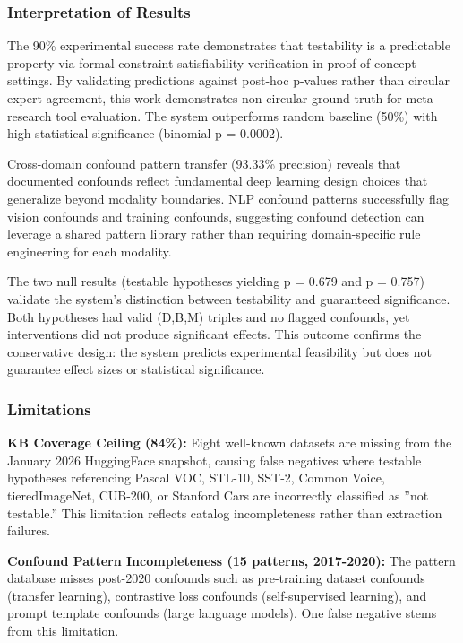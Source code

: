 
\subsubsection{Interpretation of Results}

The 90\% experimental success rate demonstrates that testability is a predictable property via formal constraint-satisfiability verification in proof-of-concept settings. By validating predictions against post-hoc p-values rather than circular expert agreement, this work demonstrates non-circular ground truth for meta-research tool evaluation. The system outperforms random baseline (50\%) with high statistical significance (binomial p = 0.0002).

Cross-domain confound pattern transfer (93.33\% precision) reveals that documented confounds reflect fundamental deep learning design choices that generalize beyond modality boundaries. NLP confound patterns successfully flag vision confounds and training confounds, suggesting confound detection can leverage a shared pattern library rather than requiring domain-specific rule engineering for each modality.

The two null results (testable hypotheses yielding p = 0.679 and p = 0.757) validate the system's distinction between testability and guaranteed significance. Both hypotheses had valid (D,B,M) triples and no flagged confounds, yet interventions did not produce significant effects. This outcome confirms the conservative design: the system predicts experimental feasibility but does not guarantee effect sizes or statistical significance.

\subsubsection{Limitations}

\textbf{KB Coverage Ceiling (84\%):} Eight well-known datasets are missing from the January 2026 HuggingFace snapshot, causing false negatives where testable hypotheses referencing Pascal VOC, STL-10, SST-2, Common Voice, tieredImageNet, CUB-200, or Stanford Cars are incorrectly classified as ''not testable.'' This limitation reflects catalog incompleteness rather than extraction failures.

\textbf{Confound Pattern Incompleteness (15 patterns, 2017-2020):} The pattern database misses post-2020 confounds such as pre-training dataset confounds (transfer learning), contrastive loss confounds (self-supervised learning), and prompt template confounds (large language models). One false negative stems from this limitation.

